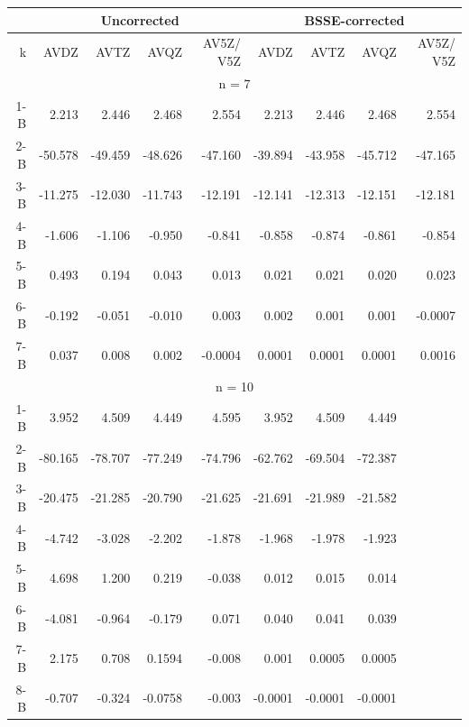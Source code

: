 \documentclass[11pt, proquest]{uwthesis}[2020/02/24]
\begin{document}
\begin{table}[]
\centering
\begin{tabular}{@{}rrrrrrrrr@{}}
\toprule
     & \multicolumn{4}{c}{Uncorrected}         & \multicolumn{4}{c}{BSSE-corrected}      \\ \midrule
k    & AVDZ    & AVTZ    & AVQZ    & AV5Z/ V5Z & AVDZ    & AVTZ    & AVQZ    & AV5Z/ V5Z \\
\hline
\multicolumn{9}{c}{n = 7}                                                                \\
\hline
1-B  & 2.213   & 2.446   & 2.468   & 2.554     & 2.213   & 2.446   & 2.468   & 2.554     \\
2-B  & -50.578 & -49.459 & -48.626 & -47.160   & -39.894 & -43.958 & -45.712 & -47.165   \\
3-B  & -11.275 & -12.030 & -11.743 & -12.191   & -12.141 & -12.313 & -12.151 & -12.181   \\
4-B  & -1.606  & -1.106  & -0.950  & -0.841    & -0.858  & -0.874  & -0.861  & -0.854    \\
5-B  & 0.493   & 0.194   & 0.043   & 0.013     & 0.021   & 0.021   & 0.020   & 0.023     \\
6-B  & -0.192  & -0.051  & -0.010  & 0.003     & 0.002   & 0.001   & 0.001   & -0.0007   \\
7-B  & 0.037   & 0.008   & 0.002   & -0.0004   & 0.0001  & 0.0001  & 0.0001  & 0.0016    \\
\hline
\multicolumn{9}{c}{n = 10}                                                               \\
\hline
1-B  & 3.952   & 4.509   & 4.449   & 4.595     & 3.952   & 4.509   & 4.449   &           \\
2-B  & -80.165 & -78.707 & -77.249 & -74.796   & -62.762 & -69.504 & -72.387 &           \\
3-B  & -20.475 & -21.285 & -20.790 & -21.625   & -21.691 & -21.989 & -21.582 &           \\
4-B  & -4.742  & -3.028  & -2.202  & -1.878    & -1.968  & -1.978  & -1.923  &           \\
5-B  & 4.698   & 1.200   & 0.219   & -0.038    & 0.012   & 0.015   & 0.014   &           \\
6-B  & -4.081  & -0.964  & -0.179  & 0.071     & 0.040   & 0.041   & 0.039   &           \\
7-B  & 2.175   & 0.708   & 0.1594  & -0.008    & 0.001   & 0.0005  & 0.0005  &           \\
8-B  & -0.707  & -0.324  & -0.0758 & -0.003    & -0.0001 & -0.0001 & -0.0001 &           \\

\end{tabular}
\end{table}
\end{document}

